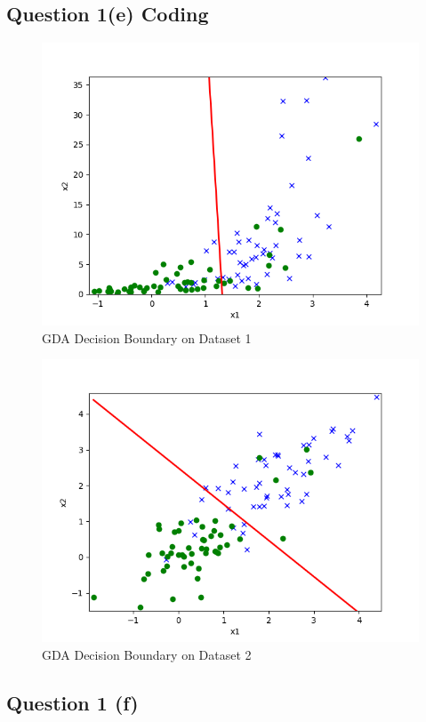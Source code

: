 \documentclass[11pt]{article}
\begin{document}
	\newpage
	\subsection{Question 1(e) Coding}
	\begin{figure}[h]
		\centering
		\includegraphics[width=0.6\linewidth]{src/linearclass/gda_pred_1.png}
		\caption{GDA Decision Boundary on Dataset 1}
	\end{figure}
	
	\begin{figure}[h]
		\centering
		\includegraphics[width=0.6\linewidth]{src/linearclass/gda_pred_2.png}
		\caption{GDA Decision Boundary on Dataset 2}
	\end{figure}
	
	\newpage
	\subsection{Question 1 (f)}
%
%	
\end{document}
